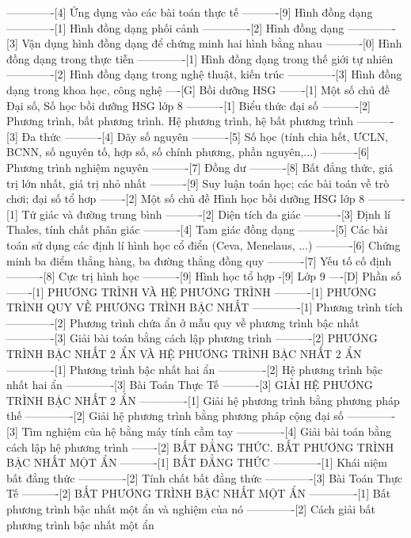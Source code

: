 -------------[4] Ứng dụng vào các bài toán thực tế
----------[9] Hình đồng dạng
-------------[1] Hình đồng dạng phối cảnh
-------------[2] Hình đồng dạng
-------------[3] Vận dụng hình đồng dạng để chứng minh hai hình bằng nhau
----------[0] Hình đồng dạng trong thực tiễn
-------------[1] Hình đồng dạng trong thế giới tự nhiên
-------------[2] Hình đồng dạng trong nghệ thuật, kiến trúc
-------------[3] Hình đồng dạng trong khoa học, công nghệ
----[G] Bồi dưỡng HSG
-------[1] Một số chủ đề Đại số, Số học bồi dưỡng HSG lớp 8
----------[1] Biểu thức đại số
----------[2] Phương trình, bất phương trình. Hệ phương trình, hệ bất phương trình
----------[3] Đa thức
----------[4] Dãy số nguyên
----------[5] Số học (tính chia hết, ƯCLN, BCNN, số nguyên tố, hợp số, số chính phương, phần nguyên,...)
----------[6] Phương trình nghiệm nguyên
----------[7] Đồng dư
----------[8] Bất đẳng thức, giá trị lớn nhất, giá trị nhỏ nhất
----------[9] Suy luận toán học; các bài toán về trò chơi; đại số tổ hơp
-------[2] Một số chủ đề Hình học bồi dưỡng HSG lớp 8
----------[1] Tứ giác và đường trung bình
----------[2] Diện tích đa giác
----------[3] Định lí Thales, tính chất phân giác
----------[4] Tam giác đồng dạng
----------[5] Các bài toán sử dụng các định lí hình học cổ điển (Ceva, Menelaus, ...)
----------[6] Chứng minh ba điểm thẳng hàng, ba đường thẳng đồng quy
----------[7] Yếu tố cố định
----------[8] Cực trị hình học
----------[9] Hình học tổ hợp
-[9] Lớp 9
----[D] Phần số
-------[1] PHƯƠNG TRÌNH VÀ HỆ PHƯƠNG TRÌNH
----------[1] PHƯƠNG TRÌNH QUY VỀ PHƯƠNG TRÌNH BẬC NHẤT
-------------[1] Phương trình tích
-------------[2] Phương trình chứa ẩn ở mẫu quy về phương trình bậc nhất
-------------[3] Giải bài toán bằng cách lập phương trình
----------[2] PHƯƠNG TRÌNH BẬC NHẤT 2 ẨN VÀ HỆ PHƯƠNG TRÌNH BẬC NHẤT 2 ẨN
-------------[1] Phương trình bậc nhất hai ẩn
-------------[2] Hệ phương trình bậc nhất hai ẩn
-------------[3] Bài Toán Thực Tế
----------[3] GIẢI HỆ PHƯƠNG TRÌNH BẬC NHẤT 2 ẨN
-------------[1] Giải hệ phương trình bằng phương pháp thế
-------------[2] Giải hệ phương trình bằng phương pháp cộng đại số
-------------[3] Tìm nghiệm của hệ bằng máy tính cầm tay
-------------[4] Giải bài toán bằng cách lập hệ phương trình
-------[2] BẤT ĐẲNG THỨC. BẤT PHƯƠNG TRÌNH BẬC NHẤT MỘT ẨN
----------[1] BẤT ĐẲNG THỨC
-------------[1] Khái niệm bất đẳng thức
-------------[2] Tính chất bất đẳng thức
-------------[3] Bài Toán Thực Tế
----------[2] BẤT PHƯƠNG TRÌNH BẬC NHẤT MỘT ẨN
-------------[1] Bất phương trình bậc nhất một ẩn và nghiệm của nó
-------------[2] Cách giải bất phương trình bậc nhất một ẩn
